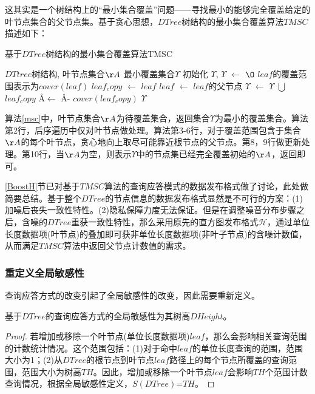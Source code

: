 这其实是一个树结构上的“最小集合覆盖”问题——寻找最小的能够完全覆盖给定的叶节点集合的父节点集。基于贪心思想，$DTree$树结构的最小集合覆盖算法$TMSC$描述如下：

\begin{algorithm}
	\caption{基于$DTree$树结构的最小集合覆盖算法TMSC}\label{euclid}
	\label{msc}
	\begin{algorithmic}[1]
		\REQUIRE $DTtree$树结构, 叶节点集合$\AA$
		\ENSURE 最小覆盖集合$\Upsilon$
		初始化 $\Upsilon$, $\Upsilon$ $\leftarrow$ $\O$
		\STATE $leaf$的覆盖范围表示为$cover(leaf)$
		\STATE $leaf_copy$ $\leftarrow$ $leaf$
		\STATE $leaf$ $\leftarrow$ $leaf$的父节点
		\ENDWHILE 
		\STATE $\Upsilon$ $\leftarrow$ $\Upsilon$ $\bigcup$ $leaf_copy$
		\STATE \AA $\leftarrow$ \AA - $cover(leaf_copy)$
		\IF{\AA = $\O$}
		\RETURN $\Upsilon$
		\ENDIF
		\ENDFOR
	\end{algorithmic}
\end{algorithm}

算法\ref{msc}中，叶节点集合$\AA$为待覆盖集合，返回集合$\Upsilon$为最小的覆盖集合。算法第2行，后序遍历中仅对叶节点做处理。算法第3-6行，对于覆盖范围包含于集合$\AA$的每个叶节点，贪心地向上取尽可能靠近根节点的父节点。第8，9行做更新处理。第10行，当$\AA$为空，则表示$\Upsilon$中的节点集已经完全覆盖初始的$\AA$，返回即可。

\ref{BoostH}节已对基于$TMSC$算法的查询应答模式的数据发布格式做了讨论，此处做简要总结。基于整个$DTree$的节点信息的数据发布格式显然是不可行的方案：(1)加噪后丧失一致性特性。(2)隐私保障力度无法保证。但是在调整噪音分布步骤之后，含噪的$DTree$重获一致性特性，那么采用原先的直方图发布格式$\mathcal{H}$，通过单位长度数据项(叶节点)的叠加即可获非单位长度数据项(非叶子节点)的含噪计数值，从而满足$TMSC$算法中返回父节点计数值的需求。

\subsubsection{重定义全局敏感性}

查询应答方式的改变引起了全局敏感性的改变，因此需要重新定义。

\begin{prop}
	\label{DTreeSensitivity}
	基于$DTree$的查询应答方式的全局敏感性为其树高$DHeight$。
\end{prop}
\begin{proof}
	若增加或移除一个叶节点(单位长度数据项)$leaf$，那么会影响相关查询范围的计数统计情况。这个范围包括：(1)对于命中$leaf$的单位长度查询的范围，范围大小为1；(2)从$DTree$的根节点到叶节点$leaf$路径上的每个节点所覆盖的查询范围，范围大小为树高$TH$。因此，增加或移除一个叶节点$leaf$会影响$TH$个范围计数查询情况，根据全局敏感性定义，$S(DTree)$=$TH$。
\end{proof}

